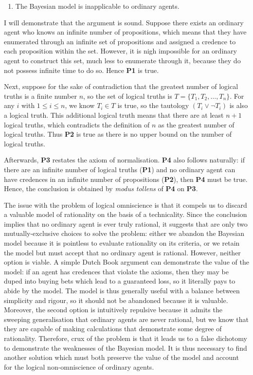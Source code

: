 \documentclass[12pt]{article}
\begin{document}
\begin{enumerate}[resume,label=\textbf{C:}, topsep=0pt, leftmargin=0.5in]
    \item The Bayesian model is inapplicable to ordinary agents.
\end{enumerate}

I will demonstrate that the argument is sound. Suppose there exists an ordinary agent who knows an infinite number of propositions, which means that they have enumerated through an infinite set of propositions and assigned a credence to each proposition within the set. However, it is nigh impossible for an ordinary agent to construct this set, much less to enumerate through it, because they do not possess infinite time to do so. Hence \textbf{P1} is true.

Next, suppose for the sake of contradiction that the greatest number of logical truths is a finite number $n$, so the set of logical truths is $T=\{T_1,T_2,\dots,T_n\}$. For any $i$ with $1\leq i\leq n$, we know $T_i\in T$ is true, so the tautology $(T_i\lor\lnot T_i)$ is also a logical truth. This additional logical truth means that there are at least $n+1$ logical truths, which contradicts the definition of $n$ as the greatest number of logical truths. Thus \textbf{P2} is true as there is no upper bound on the number of logical truths.

Afterwards, \textbf{P3} restates the axiom of normalisation. \textbf{P4} also follows naturally: if there are an infinite number of logical truths (\textbf{P1}) and no ordinary agent can have credences in an infinite number of propositions (\textbf{P2}), then \textbf{P4} must be true. Hence, the conclusion is obtained by \textit{modus tollens} of \textbf{P4} on \textbf{P3}.

The issue with the problem of logical omniscience is that it compels us to discard a valuable model of rationality on the basis of a technicality. Since the conclusion implies that no ordinary agent is ever truly rational, it suggests that are only two mutually-exclusive choices to solve the problem: either we abandon the Bayesian model because it is pointless to evaluate rationality on its criteria, or we retain the model but must accept that no ordinary agent is rational. However, neither option is viable. A simple Dutch Book argument can demonstrate the value of the model: if an agent has credences that violate the axioms, then they may be duped into buying bets which lead to a guaranteed loss, so it literally pays to abide by the model.\autocite[44]{bdrc} The model is thus generally useful with a balance between simplicity and rigour, so it should not be abandoned because it is valuable. Moreover, the second option is intuitively repulsive because it admits the sweeping generalisation that ordinary agents are never rational, but we know that they are capable of making calculations that demonstrate some degree of rationality. Therefore, crux of the problem is that it leads us to a false dichotomy to demonstrate the weaknesses of the Bayesian model. It is thus necessary to find another solution which must both preserve the value of the model and account for the logical non-omniscience of ordinary agents.
\end{document}
